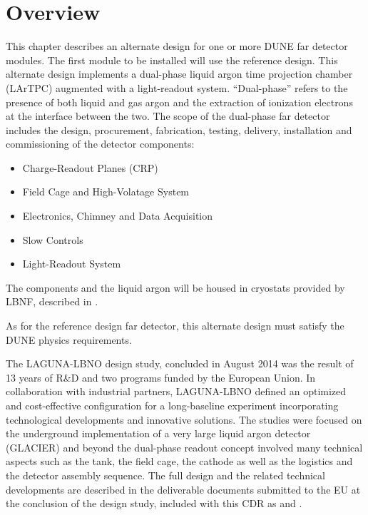 \section{Overview}
\label{sec:detectors-fd-ref-ov}

This chapter describes an alternate design for one or more DUNE far detector modules. The first module to be installed will use the reference design. This alternate design implements a dual-phase liquid argon time projection chamber (LArTPC) augmented with a light-readout system.  ``Dual-phase'' refers to the presence of both liquid and gas argon and the extraction of ionization electrons at the interface between the two. 
%
The scope of the dual-phase far detector includes the design, procurement, fabrication, testing, delivery, installation and commissioning of the detector components: 

\begin{itemize}
\item Charge-Readout Planes (CRP)
\item Field Cage and High-Volatage System  
\item Electronics, Chimney and Data Acquisition 
\item Slow Controls
\item Light-Readout System
\end{itemize}
The components and the liquid argon will be housed in cryostats provided by LBNF, described in \vollbnf. 

As for the reference design far detector, this alternate design must satisfy the DUNE physics requirements. 

The LAGUNA-LBNO design study, concluded in August 2014 was the result of 13 years of R\&D and two programs funded by the European Union. 
In collaboration with industrial partners, LAGUNA-LBNO defined an optimized and cost-effective configuration for a long-baseline experiment incorporating technological developments and innovative solutions. The studies were focused on the underground implementation of a very large liquid argon detector (GLACIER) and beyond the dual-phase readout concept involved many technical aspects such as the tank, the field cage, the cathode as well as the logistics and the detector assembly sequence. The full design and the related technical developments are described in the deliverable documents submitted to the EU at the conclusion of the design study, included with this CDR as \anxlbnoa and \anxlbnob.

